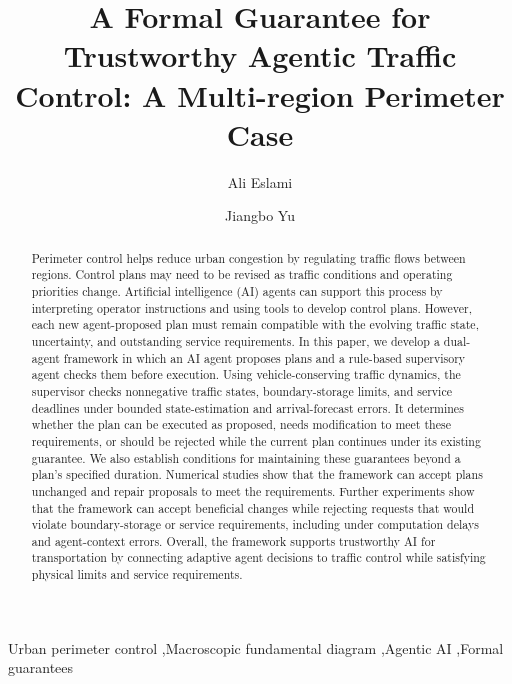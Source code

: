 \documentclass[preprint,12pt]{elsarticle}
\theoremstyle{definition}
\theoremstyle{plain}
\theoremstyle{definition}
\theoremstyle{plain}
\begin{document}
\begin{frontmatter}
\title{A Formal Guarantee for Trustworthy Agentic Traffic Control: A Multi-region Perimeter Case}
\author[mcgill]{Ali Eslami}
\author[mcgill]{Jiangbo Yu}
\begin{abstract}\fontsize{11}{13}\selectfont
Perimeter control helps reduce urban congestion by regulating traffic flows
between regions. Control plans may need to be revised as traffic conditions
and operating priorities change. Artificial intelligence (AI) agents can
support this process by interpreting operator instructions and using tools
to develop control plans. However, each new agent-proposed plan must remain
compatible with the evolving traffic state, uncertainty, and outstanding
service requirements. In this paper, we develop a dual-agent framework in
which an AI agent proposes plans and a rule-based supervisory agent checks
them before execution. Using vehicle-conserving traffic dynamics, the supervisor checks
nonnegative traffic states, boundary-storage limits, and service deadlines
under bounded state-estimation and arrival-forecast errors. It determines whether the plan can be executed as
proposed, needs modification to meet these requirements, or should be
rejected while the current plan continues under its existing guarantee.
We also establish conditions for maintaining these guarantees beyond a
plan's specified duration. Numerical studies show that the framework can
accept plans unchanged and repair proposals to meet the requirements. Further
experiments show that the framework
can accept beneficial changes while rejecting requests that would violate
boundary-storage or service requirements, including under computation
delays and agent-context errors. Overall, the framework supports
trustworthy AI for transportation by connecting adaptive agent decisions
to traffic control while satisfying physical limits and service requirements.
\end{abstract}
\begin{keyword}
Urban perimeter control \sep Macroscopic fundamental diagram \sep Agentic AI \sep Formal guarantees
\end{keyword}
\end{frontmatter}
\end{document}
